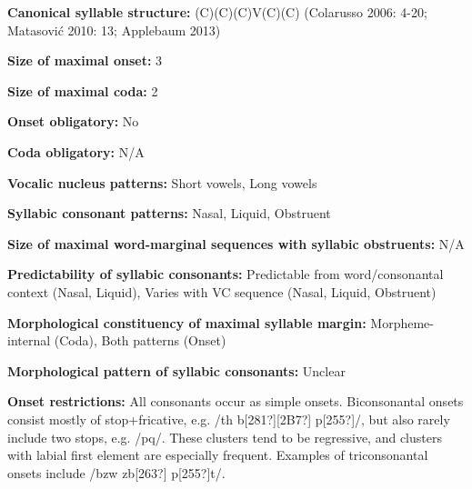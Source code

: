 \begin{styleBody}
\textbf{Canonical syllable structure:} (C)(C)(C)V(C)(C)\textbf{ }(Colarusso 2006: 4-20; Matasović 2010: 13; Applebaum 2013)
\end{styleBody}

\begin{styleBody}
\textbf{Size of maximal onset:} 3
\end{styleBody}

\begin{styleBody}
\textbf{Size of maximal coda:} 2
\end{styleBody}

\begin{styleBody}
\textbf{Onset obligatory: }No
\end{styleBody}

\begin{styleBody}
\textbf{Coda obligatory:} N/A
\end{styleBody}

\begin{styleBody}
\textbf{Vocalic nucleus patterns:} Short vowels, Long vowels
\end{styleBody}

\begin{styleBody}
\textbf{Syllabic consonant patterns:} Nasal, Liquid, Obstruent
\end{styleBody}

\begin{styleBody}
\textbf{Size of maximal word{}-marginal sequences with syllabic obstruents:} N/A
\end{styleBody}

\begin{styleBody}
\textbf{Predictability of syllabic consonants:} Predictable from word/consonantal context (Nasal, Liquid), Varies with VC sequence (Nasal, Liquid, Obstruent)
\end{styleBody}

\begin{styleBody}
\textbf{Morphological constituency of maximal syllable margin:} Morpheme-internal (Coda), Both patterns (Onset)
\end{styleBody}

\begin{styleBody}
\textbf{Morphological pattern of syllabic consonants:} Unclear
\end{styleBody}

\begin{styleBody}
\textbf{Onset restrictions: }All consonants occur as simple onsets. Biconsonantal onsets consist mostly of stop+fricative, e.g. /th b[281?][2B7?] p[255?]/, but also rarely include two stops, e.g. /pq/. These clusters tend to be regressive, and clusters with labial first element are especially frequent. Examples of triconsonantal onsets include /bzw zb[263?] p[255?]t/.
\end{styleBody}

